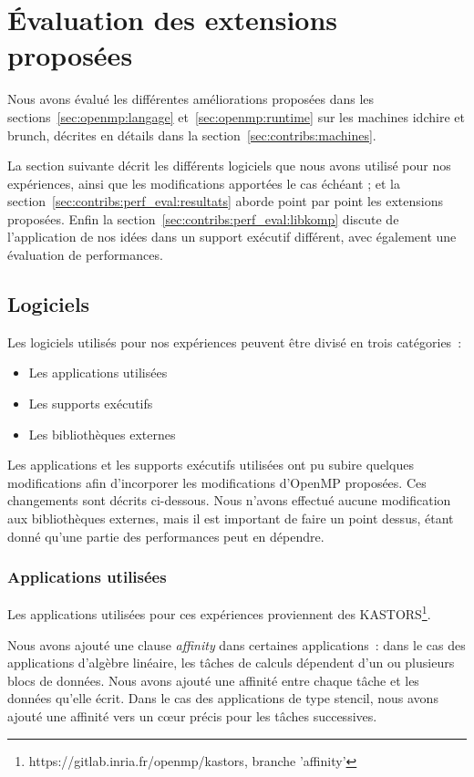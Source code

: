 \section{Évaluation des extensions proposées}\label{sec:contribs:perf_eval}

Nous avons évalué les différentes améliorations proposées dans les sections~\ref{sec:openmp:langage} et~\ref{sec:openmp:runtime} sur les machines idchire et brunch, décrites en détails dans la section~\ref{sec:contribs:machines}.

La section suivante décrit les différents logiciels que nous avons utilisé pour nos expériences, ainsi que les modifications apportées le cas échéant ; et la section~\ref{sec:contribs:perf_eval:resultats} aborde point par point les extensions proposées.
Enfin la section~\ref{sec:contribs:perf_eval:libkomp} discute de l'application de nos idées dans un support exécutif différent, avec également une évaluation de performances.


\subsection{Logiciels}

Les logiciels utilisés pour nos expériences peuvent être divisé en trois catégories~:
\begin{itemize}
  \item Les applications utilisées
  \item Les supports exécutifs
  \item Les bibliothèques externes
\end{itemize}

Les applications et les supports exécutifs utilisées ont pu subire quelques modifications afin d'incorporer les modifications d'OpenMP proposées.
Ces changements sont décrits ci-dessous.
Nous n'avons effectué aucune modification aux bibliothèques externes, mais il est important de faire un point dessus, étant donné qu'une partie des performances peut en dépendre.

\subsubsection{Applications utilisées}

Les applications utilisées pour ces expériences proviennent des KASTORS\footnote{https://gitlab.inria.fr/openmp/kastors, branche 'affinity'}.

Nous avons ajouté une clause \emph{affinity} dans certaines applications~: dans le cas des applications d'algèbre linéaire, les tâches de calculs dépendent d'un ou plusieurs blocs de données. Nous avons ajouté une affinité entre chaque tâche et les données qu'elle écrit.
Dans le cas des applications de type stencil, nous avons ajouté une affinité vers un cœur précis pour les tâches successives.


